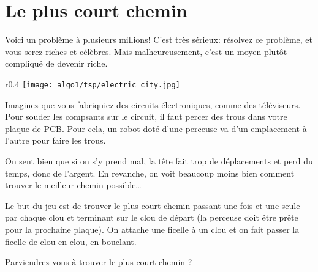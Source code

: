 \chapter*{Le plus court chemin}

Voici un problème à plusieurs millions! C'est très sérieux: résolvez ce
problème, et vous serez riches et célèbres. Mais malheureusement, c'est un moyen
plutôt compliqué de devenir riche.

\bigskip
\begin{wrapfigure}{r}{0.4\linewidth}
  \vspace{-\baselineskip}
  \texttt{[image: algo1/tsp/electric\_city.jpg]}
  \vspace{-2\baselineskip}
  \label{img:electric:city}
\end{wrapfigure}

Imaginez que vous fabriquiez des circuits électroniques, comme des téléviseurs.
Pour souder les compsants sur le circuit, il faut percer des trous dans votre
plaque de PCB. Pour cela, un robot doté d'une perceuse va d'un emplacement à
l'autre pour faire les trous.

\medskip
On sent bien que si on s'y prend mal, la tête fait trop de déplacements et perd
du temps, donc de l'argent. En revanche, on voit beaucoup moins bien comment
trouver le meilleur chemin possible\ldots


Le but du jeu est de trouver le plus court chemin passant une fois et une seule
par chaque clou et terminant sur le clou de départ (la perceuse doit être prête
pour la prochaine plaque). On attache une ficelle à un clou et on fait passer la
ficelle de clou en clou, en bouclant.

\bigskip
Parviendrez-vous à trouver le plus court chemin ?

\newpage

